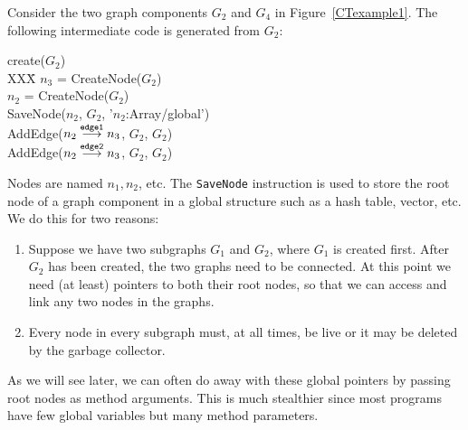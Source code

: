 Consider the two graph components $G_2$ and $G_4$ in 
Figure~\ref{CTexample1}. The following intermediate 
code is generated from $G_2$:
\begin{tt}
\begin{tabbing}
create($G_2$) \\
XXX\=\kill
\>   $n_3$ = CreateNode($G_2$) \\
\>   $n_2$ = CreateNode($G_2$) \\
\>   SaveNode($n_2$, $G_2$, '$n_2$:Array/global') \\
\>   AddEdge($n_2\stackrel{{\tt edge1}}{\longrightarrow}n_3$, $G_2$, $G_2$) \\
\>   AddEdge($n_2\stackrel{{\tt edge2}}{\longrightarrow}n_3$, $G_2$, $G_2$) 
\end{tabbing}
\end{tt}
Nodes are named $n_1,n_2$, etc. The {\tt SaveNode} instruction
is used to store the root node of a graph component in a 
global structure such as a hash table, vector, etc. We do this
for two reasons:
\begin{enumerate}
   \item Suppose we have two subgraphs $G_1$ and $G_2$,
         where $G_1$ is created first. After $G_2$ has
         been created, the two graphs need to be connected.
         At this point we need (at least) pointers to
         both their root nodes, so that we can access and
         link any two nodes in the graphs. 
   \item Every node in every subgraph must, at all times, 
         be live or it may be deleted by the garbage 
         collector.
\end{enumerate}
As we will see later, we can often do away with these
global pointers by passing root nodes as method
arguments. This is much stealthier since most programs
have few global variables but many method parameters.

